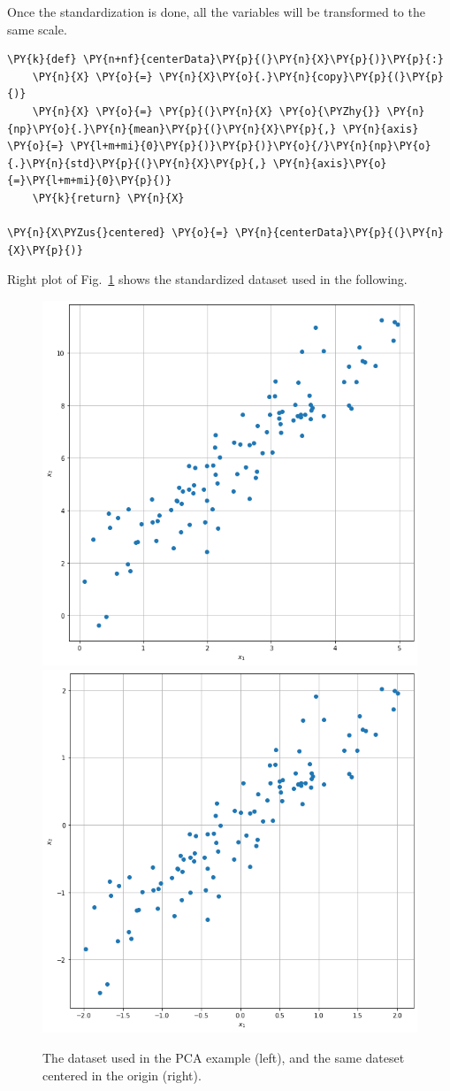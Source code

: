 Once the standardization is done, all the variables will be transformed to the same scale.

\begin{tcolorbox}[breakable, size=fbox, boxrule=1pt, pad at break*=1mm,colback=cellbackground, colframe=cellborder]
\begin{Verbatim}[commandchars=\\\{\}]
\PY{k}{def} \PY{n+nf}{centerData}\PY{p}{(}\PY{n}{X}\PY{p}{)}\PY{p}{:}
    \PY{n}{X} \PY{o}{=} \PY{n}{X}\PY{o}{.}\PY{n}{copy}\PY{p}{(}\PY{p}{)}
    \PY{n}{X} \PY{o}{=} \PY{p}{(}\PY{n}{X} \PY{o}{\PYZhy{}} \PY{n}{np}\PY{o}{.}\PY{n}{mean}\PY{p}{(}\PY{n}{X}\PY{p}{,} \PY{n}{axis} \PY{o}{=} \PY{l+m+mi}{0}\PY{p}{)}\PY{p}{)}\PY{o}{/}\PY{n}{np}\PY{o}{.}\PY{n}{std}\PY{p}{(}\PY{n}{X}\PY{p}{,} \PY{n}{axis}\PY{o}{=}\PY{l+m+mi}{0}\PY{p}{)}
    \PY{k}{return} \PY{n}{X}

\PY{n}{X\PYZus{}centered} \PY{o}{=} \PY{n}{centerData}\PY{p}{(}\PY{n}{X}\PY{p}{)}
\end{Verbatim}
\end{tcolorbox}

Right plot of Fig.~\ref{fig:pca_dataset} shows the standardized dataset
used in the following.

\begin{figure}[htb]
	\centering
	\includegraphics[width=0.45\linewidth]{figures/pca_dataset}
	\includegraphics[width=0.45\linewidth]{figures/pca_dataset_centered}
	\caption{The dataset used in the PCA example (left), and
		the same dateset centered in the origin (right).}
	\label{fig:pca_dataset}
\end{figure}


